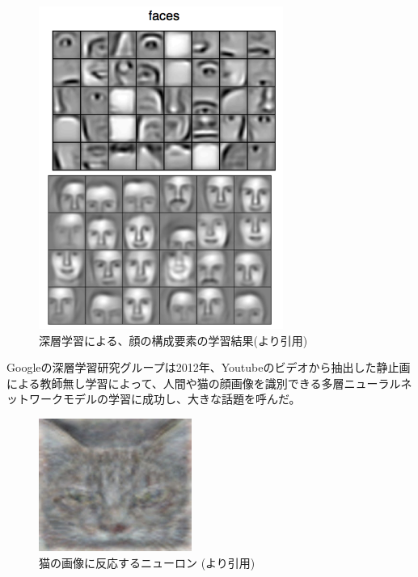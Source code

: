 \begin{figure}[tbp]
 \centering
  \includegraphics[width=80mm]{img/c1/lee2009_faces}
 \caption{深層学習による、顔の構成要素の学習結果(\cite{lee2009convolutional}より引用)}
 \label{c1_lee2009_faces}
\end{figure}
\par

Googleの深層学習研究グループは2012年、Youtubeのビデオから抽出した静止画による教師無し学習によって、人間や猫の顔画像を識別できる多層ニューラルネットワークモデルの学習に成功し、大きな話題を呼んだ\cite{le2012building}。\par
\begin{figure}[tbp]
 \begin{center}
  \includegraphics[width=50mm]{img/c1/cat_detection}
 \end{center}
 \caption{猫の画像に反応するニューロン (\cite{le2012building}より引用)}
 \label{c1_catdetection}
\end{figure}

